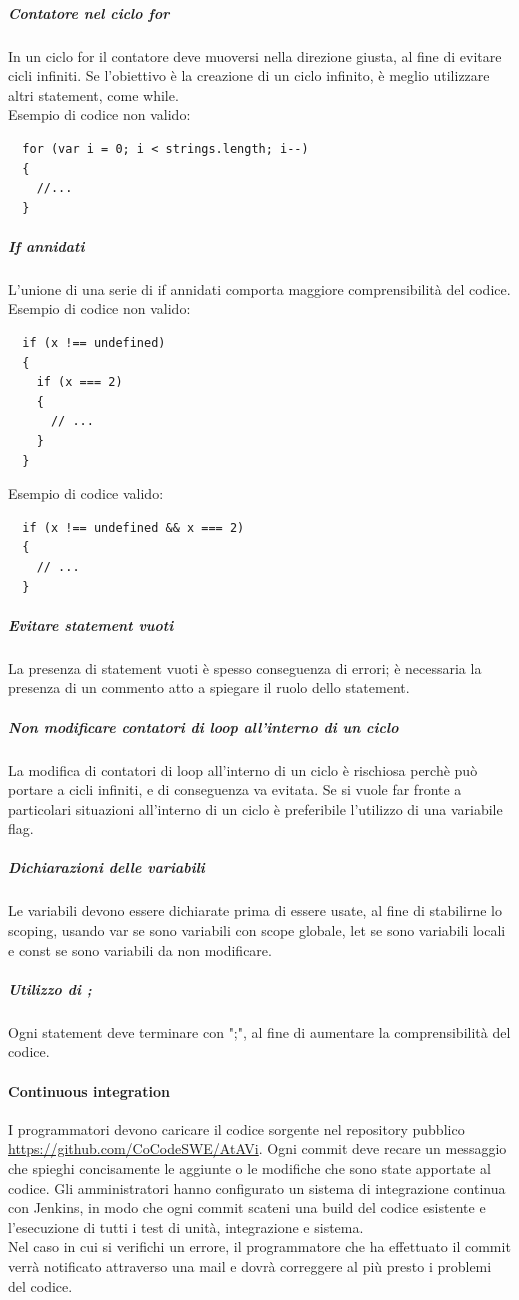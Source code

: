 \subparagraph{Contatore nel ciclo for}
In un ciclo for il contatore deve muoversi nella direzione giusta, al fine di evitare cicli infiniti. Se l'obiettivo è la creazione di un ciclo infinito, è meglio utilizzare altri statement, come while.\\
Esempio di codice non valido:
\begin{verbatim}
  for (var i = 0; i < strings.length; i--) 
  { 
    //...
  }
\end{verbatim}

\subparagraph{If annidati}
L'unione di una serie di if annidati comporta maggiore comprensibilità del codice.\\
Esempio di codice non valido:
\begin{verbatim}
  if (x !== undefined) 
  {
    if (x === 2) 
    {
      // ...
    }
  }
\end{verbatim}
Esempio di codice valido:
\begin{verbatim}
  if (x !== undefined && x === 2) 
  {
    // ...
  }
\end{verbatim}
\subparagraph{Evitare statement vuoti}
La presenza di statement vuoti è spesso conseguenza di errori; è necessaria la presenza di un commento atto a spiegare il ruolo dello statement.

\subparagraph{Non modificare contatori di loop all'interno di un ciclo}
La modifica di contatori di loop all'interno di un ciclo è rischiosa perchè può portare a cicli infiniti, e di conseguenza va evitata. Se si vuole far fronte a particolari situazioni all'interno di un ciclo è preferibile l'utilizzo di una variabile flag.

\subparagraph{Dichiarazioni delle variabili}
Le variabili devono essere dichiarate prima di essere usate, al fine di stabilirne lo scoping, usando var se sono variabili con scope globale, let se sono variabili locali e const se sono variabili da non modificare.
\subparagraph{Utilizzo di ;}
Ogni statement deve terminare con ";", al fine di aumentare la comprensibilità del codice.

\paragraph{Continuous integration}\label{CI}
I programmatori devono caricare il codice sorgente nel repository pubblico \url{https://github.com/CoCodeSWE/AtAVi}.
Ogni commit deve recare un messaggio che spieghi concisamente le aggiunte o le modifiche che sono state apportate al codice. Gli amministratori hanno configurato un sistema di integrazione continua con Jenkins, in modo che ogni commit scateni
una build del codice esistente e l'esecuzione di tutti i test di unità, integrazione e sistema. \\
Nel caso in cui si verifichi un errore, il programmatore che ha effettuato il commit verrà notificato attraverso una mail e dovrà correggere al più presto i problemi del codice.

